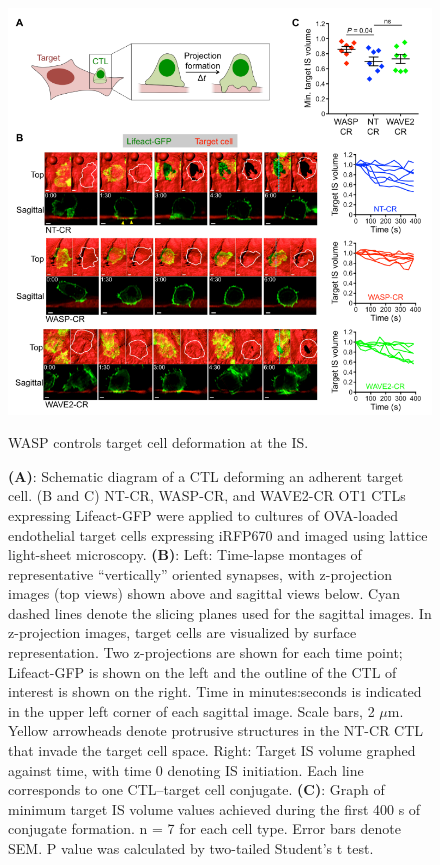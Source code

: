 \begin{figure}[htbp]
	\centering
	\includegraphics[width=\textwidth]{../figures/chapter2/fig7lls.png}
	\caption{WASP controls target cell deformation at the IS.}
	\caption*{\textbf{(A)}: Schematic diagram of a CTL deforming an adherent target cell. (B and C) NT-CR, WASP-CR, and WAVE2-CR OT1 CTLs expressing Lifeact-GFP were applied to cultures of OVA-loaded endothelial target cells expressing iRFP670 and imaged using lattice light-sheet microscopy. \textbf{(B)}: Left: Time-lapse montages of representative “vertically” oriented synapses, with z-projection images (top views) shown above and sagittal views below. Cyan dashed lines denote the slicing planes used for the sagittal images. In z-projection images, target cells are visualized by surface representation. Two z-projections are shown for each time point; Lifeact-GFP is shown on the left and the outline of the CTL of interest is shown on the right. Time in minutes:seconds is indicated in the upper left corner of each sagittal image. Scale bars, 2 $\mu$m. Yellow arrowheads denote protrusive structures in the NT-CR CTL that invade the target cell space. Right: Target IS volume graphed against time, with time 0 denoting IS initiation. Each line corresponds to one CTL–target cell conjugate. \textbf{(C)}: Graph of minimum target IS volume values achieved during the first 400 s of conjugate formation. n = 7 for each cell type. Error bars denote SEM. P value was calculated by two-tailed Student’s t test.}
	\label{fig:fig7lls}
\end{figure}

